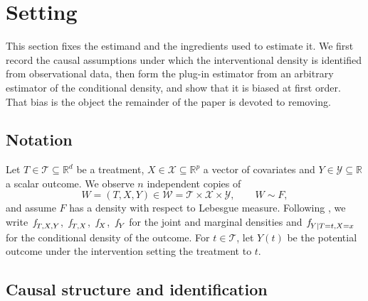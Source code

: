 \documentclass[11pt]{article}
\theoremstyle{plain}
\theoremstyle{definition}
\theoremstyle{remark}
\newcommand{\R}{\mathbb{R}}
\newcommand{\cW}{\ensuremath{\mathcal{W}}}
\newcommand{\cX}{\ensuremath{\mathcal{X}}}
\newcommand{\cY}{\ensuremath{\mathcal{Y}}}
\newcommand{\cT}{\ensuremath{\mathcal{T}}}
\newcommand{\pf}[1]{\ensuremath{\,\mathlarger{\textit{f}}_{#1}}}
\begin{document}
%

\section{Setting}
\label{sec:setting}

This section fixes the estimand and the ingredients used to estimate it. We first record the
causal assumptions under which the interventional density is identified from observational
data, then form the plug-in estimator from an arbitrary estimator of the conditional density,
and show that it is biased at first order. That bias is the object the remainder of the paper
is devoted to removing.

\subsection{Notation}
\label{sec:setting-notation}

Let $T \in \cT \subseteq \R^{d}$ be a treatment, $X \in \cX \subseteq \R^{p}$ a vector of
covariates and $Y \in \cY \subseteq \R$ a scalar outcome. We observe $n$ independent copies
of
\[
W = (T,X,Y) \in \cW = \cT \times \cX \times \cY , \qquad W \sim F,
\]
and assume $F$ has a density with respect to Lebesgue measure. Following
\citet{meziani2025mcd}, we write $\pf{T,X,Y}$, $\pf{T,X}$, $\pf{X}$, $\pf{Y}$ for the joint
and marginal densities and $\pf{Y \mid T=t,X=x}$ for the conditional density of the outcome.
For $t \in \cT$, let $Y(t)$ be the potential outcome under the intervention setting the
treatment to $t$.

\subsection{Causal structure and identification}
\label{sec:setting-id}
\end{document}
